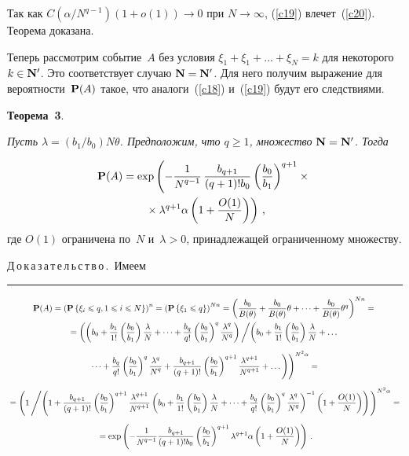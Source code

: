 \begin{multicols}{2}

Так как  $C(\alpha/N^{q-1})(1+o(1))\to 0$ при $ N\to\infty$, (\ref{c19}) влечет~(\ref{c20}). Теорема доказана.

\medskip

Теперь рассмотрим событие~$A$ без условия $\xi_1 + \xi_1 + \dots +
\xi_N=k$ для некоторого~$k\in{\bf N'}$. Это соответствует случаю
${\bf N}={\bf N'}$. Для него получим выражение для вероятности~${\bf P}(A)$
такое, что аналоги~(\ref{c18}) и~(\ref{c19}) будут его следствиями.

\medskip

\noindent
{\bf Теорема~3}.  {\it  Пусть $\lambda=(b_1/b_0)N\theta$.
Предположим, что $q \ge 1$, множество ${\bf N}={\bf N'}$.
  Тогда

\noindent
\begin{multline}
{\bf P}(A)=\exp\left(-\fr{1}{N^{q-1}}\,\fr{b_{q+1}}{(q+1)!b_0}
\left(\fr{b_0}{b_1}\right)^{q+1}\times{}\right.\\
\left.{}\times \lambda^{q+1}\alpha\left(1+\fr{O(1)}{N}\right)\right)\,,
\label{c21}
\end{multline}
где $O(1)$ ограничена по~$N$ и~$\lambda>0$, принадлежащей
ограниченному множеству.}

\medskip

\noindent
Д\,о\,к\,а\,з\,а\,т\,е\,л\,ь\,с\,т\,в\,о\,.\ Имеем

\end{multicols}
\pagebreak

\hrule

\noindent
\begin{multline*}
{\bf P}(A)=\left({\bf P}\left\{\xi_i\le q, 1\le i\le
N\right\}\right)^n =
\left({\bf P}\left\{\xi_1\le
q\right\}\right)^{Nn}=\left(\fr{b_0}{B(\theta)} +
\fr{b_0}{B(\theta)}\theta + \cdots +
\fr{b_0}{B(\theta)}\theta^q\right)^{Nn} ={}
\\
{}=
\left(\left(b_0+\fr{b_1}{1!}\left(\fr{b_0}{b_1}\right)\fr{\lambda}{N}+\dots
+\fr{b_q}{q!}\left(\fr{b_0}{b_1}\right)^{q}\fr{\lambda^q}{N^q}\right)\left/
\left( b_0+\fr{b_1}{1!}\left(\fr{b_0}{b_1}\right)
\fr{\lambda}{N}+ \dots {}\right.\right.\right.\\[6pt]
\left.\left.\dots +\fr{b_q}{q!}\left(\fr{b_0}{b_1}\right)^{q}\fr{\lambda^q}{N^q}
+\fr{b_{q+1}}{(q+1)!}\left(\fr{b_0}{b_1}\right)^{q+1}\fr{\lambda^{q+1}}{N^{q+1}}+\dots\right)
\right)^{N^2\alpha}={}\\[6pt]
{}=
\left(1\left/ \left(1+\fr{b_{q+1}}{(q+1)!}\left(\fr{b_0}{b_1}\right)^{q+1}\fr{\lambda^{q+1}}{N^{q+1}}
\left({b_0}+\fr{b_1}{1!}\left(\fr{b_0}{b_1}\right)\fr{\lambda}{N}+\dots
+\fr{b_q}{q!}\left(\fr{b_0}{b_1}\right)^{q}\fr{\lambda^q}{N^q}\right)^{-1}\left(1+\fr{O(1)}{N}\right)\right)\right.
\right)^{N^2\alpha}={}\\[6pt]
{}=
\exp\left(-\fr{1}{N^{q-1}}\fr{b_{q+1}}{(q+1)!b_0}\left(\fr{b_0}{b_1}\right)^{q+1}\lambda^{q+1}\alpha\left(1+
\fr{O(1)}{N}\right)\right)\,.
\end{multline*}

